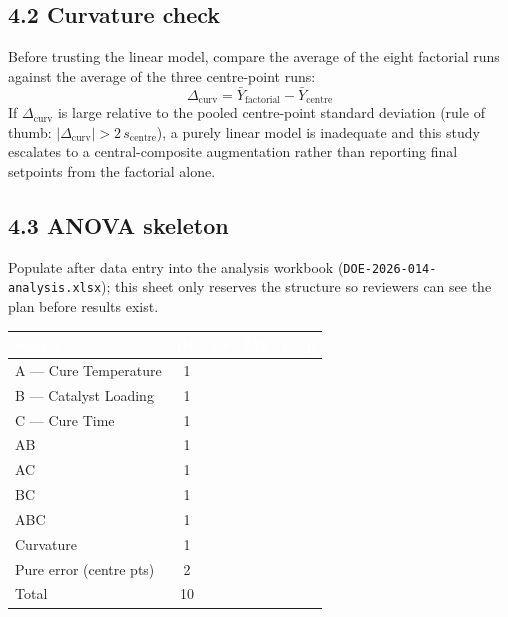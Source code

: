 \subsection*{4.2 Curvature check}
Before trusting the linear model, compare the average of the eight factorial runs against the
average of the three centre-point runs:
\[
  \Delta_{\text{curv}} = \bar{Y}_{\text{factorial}} - \bar{Y}_{\text{centre}}
\]
If \(\Delta_{\text{curv}}\) is large relative to the pooled centre-point standard deviation
(rule of thumb: \(|\Delta_{\text{curv}}| > 2\,s_{\text{centre}}\)), a purely linear model is
inadequate and this study escalates to a central-composite augmentation rather than reporting
final setpoints from the factorial alone.

\subsection*{4.3 ANOVA skeleton}
Populate after data entry into the analysis workbook (\texttt{DOE-2026-014-analysis.xlsx});
this sheet only reserves the structure so reviewers can see the plan before results exist.

\vspace{0.3em}
\begin{center}
\footnotesize
\renewcommand{\arraystretch}{1.3}
\begin{tabular}{@{}l c c c c c@{}}
\toprule
\rowcolor{doeprimary}
\textcolor{white}{\textbf{Source}} & \textcolor{white}{\textbf{DF}} & \textcolor{white}{\textbf{SS}} &
\textcolor{white}{\textbf{MS}} & \textcolor{white}{\textbf{F}} & \textcolor{white}{\textbf{p}} \\
\midrule
A --- Cure Temperature   & 1 & & & & \\
B --- Catalyst Loading   & 1 & & & & \\
C --- Cure Time          & 1 & & & & \\
AB                       & 1 & & & & \\
AC                       & 1 & & & & \\
BC                       & 1 & & & & \\
ABC                      & 1 & & & & \\
Curvature                & 1 & & & & \\
Pure error (centre pts)  & 2 & & & & \\
\midrule
Total                    & 10 & & & & \\
\bottomrule
\end{tabular}
\end{center}


